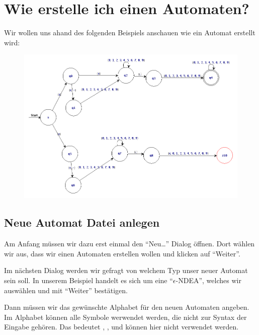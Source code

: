 \chapter{Wie erstelle ich einen Automaten?}

Wir wollen uns ahand des folgenden Beispiels anschauen wie ein Automat erstellt
wird:\vspace{10pt}

\begin{figure}[h]
\begin{center}
\includegraphics[width=12cm]{images/enfa_example.png}
\end{center}
\end{figure}

\section{Neue Automat Datei anlegen}

Am Anfang müssen wir dazu erst einmal den "`Neu\ldots"' Dialog öffnen. Dort
wählen wir aus, dass wir einen Automaten erstellen wollen und klicken
auf "`Weiter"'.\vspace{10pt}

Im nächsten Dialog werden wir gefragt von welchem Typ unser neuer
Automat sein soll. In unserem Beispiel handelt es sich um eine
"`$\epsilon$-NDEA"', welches wir auswählen und mit "`Weiter"'
bestätigen.\vspace{10pt}

Dann müssen wir das gewünschte Alphabet für den neuen Automaten
angeben. Im Alphabet können alle Symbole werwendet werden, die nicht zur Syntax
der Eingabe gehören. Das bedeutet \Symbol{,}, \Symbol{\{}, \Symbol{\}} und
\SymbolEmpty{} können hier nicht verwendet werden.\vspace{10pt}

